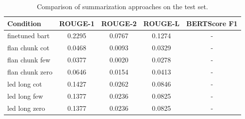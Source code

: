 \begin{table}[h]
\centering
\begin{tabular}{lcccc}
\hline
\textbf{Condition} & \textbf{ROUGE-1} & \textbf{ROUGE-2} & \textbf{ROUGE-L} & \textbf{BERTScore F1} \\
\hline
finetuned bart & 0.2295 & 0.0767 & 0.1274 & - \\
flan chunk cot & 0.0468 & 0.0093 & 0.0329 & - \\
flan chunk few & 0.0377 & 0.0020 & 0.0278 & - \\
flan chunk zero & 0.0646 & 0.0154 & 0.0413 & - \\
led long cot & 0.1427 & 0.0262 & 0.0846 & - \\
led long few & 0.1377 & 0.0236 & 0.0825 & - \\
led long zero & 0.1377 & 0.0236 & 0.0825 & - \\
\hline
\end{tabular}
\caption{Comparison of summarization approaches on the test set.}
\label{tab:results}
\end{table}
